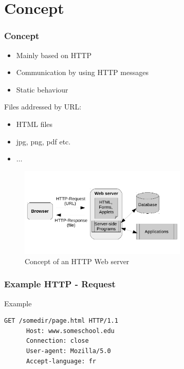 \documentclass[9pt]{beamer}
\begin{document}
\section{Concept}
\begin{frame}
 \frametitle<presentation>{Concept}
 
 \begin{multicols}{2}
    \begin{itemize}
      \item Mainly based on HTTP
      \item Communication by using HTTP messages
      \item Static behaviour
    \end{itemize}
  
   Files addressed by URL:
    \begin{itemize}
      \item HTML files
      \item jpg, png, pdf etc.
      \item $\hdots $
    \end{itemize}
  \end{multicols}
  
  \begin{figure}[h]
    \centerline{\includegraphics[width=8cm]{pics/webclient.pdf}}
    \caption{Concept of an HTTP Web server}
    \label{fig-webserverconcept}
  \end{figure}

\end{frame}

\begin{frame}[fragile]
 \frametitle<presentation>{Example HTTP - Request}
  \begin{exampleblock}{Example}
    \begin{lstlisting}[mathescape, captionpos=b,caption={Simple HTTP request message. Taken from \cite{kurose}},label=lst:httpRequest]
      GET /somedir/page.html HTTP/1.1
      Host: www.someschool.edu
      Connection: close
      User-agent: Mozilla/5.0
      Accept-language: fr
    \end{lstlisting}
  \end{exampleblock}
\end{frame}
\end{document}

